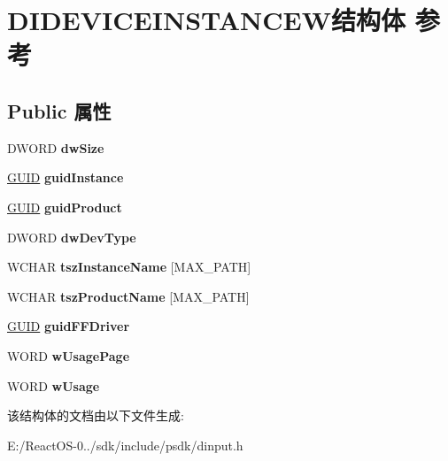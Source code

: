 \hypertarget{struct_d_i_d_e_v_i_c_e_i_n_s_t_a_n_c_e_w}{}\section{D\+I\+D\+E\+V\+I\+C\+E\+I\+N\+S\+T\+A\+N\+C\+E\+W结构体 参考}
\label{struct_d_i_d_e_v_i_c_e_i_n_s_t_a_n_c_e_w}
\subsection*{Public 属性}
\begin{DoxyCompactItemize}
\item 
\mbox{\label{struct_d_i_d_e_v_i_c_e_i_n_s_t_a_n_c_e_w_a74ad8575e74fade39a58a23053ff9cc6}} 
D\+W\+O\+RD {\bfseries dw\+Size}
\item 
\mbox{\label{struct_d_i_d_e_v_i_c_e_i_n_s_t_a_n_c_e_w_ae70f04afc0a1ec321c6e127a74fe2aea}} 
\hyperlink{interface_g_u_i_d}{G\+U\+ID} {\bfseries guid\+Instance}
\item 
\mbox{\label{struct_d_i_d_e_v_i_c_e_i_n_s_t_a_n_c_e_w_abd493000bafbf8d6c63d4e3be60f510b}} 
\hyperlink{interface_g_u_i_d}{G\+U\+ID} {\bfseries guid\+Product}
\item 
\mbox{\label{struct_d_i_d_e_v_i_c_e_i_n_s_t_a_n_c_e_w_a1c4b9fe0fb9fc915e7a213e6c2ffd597}} 
D\+W\+O\+RD {\bfseries dw\+Dev\+Type}
\item 
\mbox{\label{struct_d_i_d_e_v_i_c_e_i_n_s_t_a_n_c_e_w_ac513af8275475a6ceba700f896b72108}} 
W\+C\+H\+AR {\bfseries tsz\+Instance\+Name} \mbox{[}M\+A\+X\+\_\+\+P\+A\+TH\mbox{]}
\item 
\mbox{\label{struct_d_i_d_e_v_i_c_e_i_n_s_t_a_n_c_e_w_a1e11fc845c9a7c5bc41a5fa6d7bed917}} 
W\+C\+H\+AR {\bfseries tsz\+Product\+Name} \mbox{[}M\+A\+X\+\_\+\+P\+A\+TH\mbox{]}
\item 
\mbox{\label{struct_d_i_d_e_v_i_c_e_i_n_s_t_a_n_c_e_w_a549002e76313c10b693a332ea2f0becf}} 
\hyperlink{interface_g_u_i_d}{G\+U\+ID} {\bfseries guid\+F\+F\+Driver}
\item 
\mbox{\label{struct_d_i_d_e_v_i_c_e_i_n_s_t_a_n_c_e_w_a058b479fafe53772e312f56fb70077a6}} 
W\+O\+RD {\bfseries w\+Usage\+Page}
\item 
\mbox{\label{struct_d_i_d_e_v_i_c_e_i_n_s_t_a_n_c_e_w_acb2a8214708cf192c6ca239db47bc485}} 
W\+O\+RD {\bfseries w\+Usage}
\end{DoxyCompactItemize}


该结构体的文档由以下文件生成\+:\begin{DoxyCompactItemize}
\item 
E\+:/\+React\+O\+S-\/0../sdk/include/psdk/dinput.\+h\end{DoxyCompactItemize}
